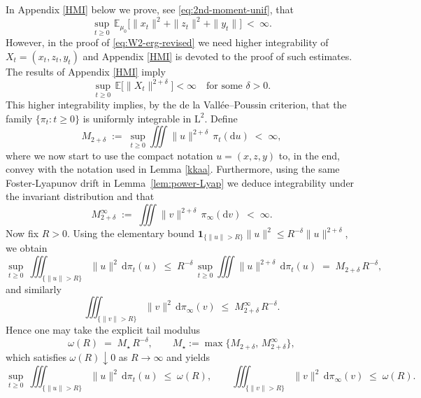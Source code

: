 \documentclass[11pt, a4paper,leqno]{amsart}
\theoremstyle{definition}
\numberwithin{equation}{section}
\begin{document}
 In Appendix \ref{HMI} below we prove, see \eqref{eq:2nd-moment-unif}, that\begin{equation*}
\sup_{t\ge0}\,\mathbb E_{\mu_0}\bigl[\| x_t\|^2+\| z_t\|^2+\| y_t\|\bigr]\ <\ \infty.
\end{equation*}
However, in the proof of \eqref{eq:W2-erg-revised} we need higher integrability of $ X_t=( x_t, z_t,  y_t)$ and  Appendix \ref{HMI}  is devoted to the proof of such estimates. The results of Appendix \ref{HMI} imply
\[
\sup_{t\ge0}\,\mathbb E\bigl[\| X_t\|^{2+\delta}\bigr] < \infty
\quad\text{for some }\delta>0.
\]
This higher integrability implies, by the de la Vallée–Poussin criterion, that the family $\{\pi_t:t\ge0\}$ is uniformly integrable in $\mathrm L^2$. Define
\[
M_{2+\delta}\;:=\;\sup_{t\ge0}\iiint \|u\|^{2+\delta}\,\pi_t(\mathrm du)\;<\;\infty,
\]
where we now start to use the compact notation $u=(x,z,y)$ to, in the end, convey with the notation used in Lemma \ref{kkaa}. Furthermore, using the same Foster-Lyapunov drift in Lemma~\ref{lem:power-Lyap} we deduce integrability under the invariant distribution and that
\[
M_{2+\delta}^\infty\;:=\;\iiint \|v\|^{2+\delta}\,\pi_\infty(\mathrm dv)\;<\;\infty.
\]
Now fix  $R>0$. Using the elementary bound $\mathbf 1_{\{\|u\|>R\}}\|u\|^2\le R^{-\delta}\|u\|^{2+\delta}$, we obtain
\[
\sup_{t\ge0}\ \iiint_{\{\|u\|>R\}}\|u\|^2\,\mathrm d\pi_t(u)
\;\le\; R^{-\delta}\,\sup_{t\ge0}\iiint \|u\|^{2+\delta}\,\mathrm d\pi_t(u)
\;=\; M_{2+\delta}\,R^{-\delta},
\]
and similarly
\[
\iiint_{\{\|v\|>R\}}\|v\|^2\,\mathrm d\pi_\infty(v)
\;\le\; M_{2+\delta}^\infty\,R^{-\delta}.
\]
Hence one may take the explicit tail modulus
\[
\omega(R)\;=\;M_\star\,R^{-\delta},
\qquad
M_\star:=\max\{M_{2+\delta},\,M_{2+\delta}^\infty\},
\]
which satisfies $\omega(R)\downarrow0$ as $R\to\infty$ and yields
\begin{equation}\label{eq:UI}
\sup_{t\ge0}\ \iiint_{\{\|u\|>R\}}\|u\|^2\,\mathrm d\pi_t(u) \;\le\; \omega(R),
\qquad
\iiint_{\{\|v\|>R\}}\|v\|^2\,\mathrm d\pi_\infty(v) \;\le\; \omega(R).
\end{equation}
\end{document}
